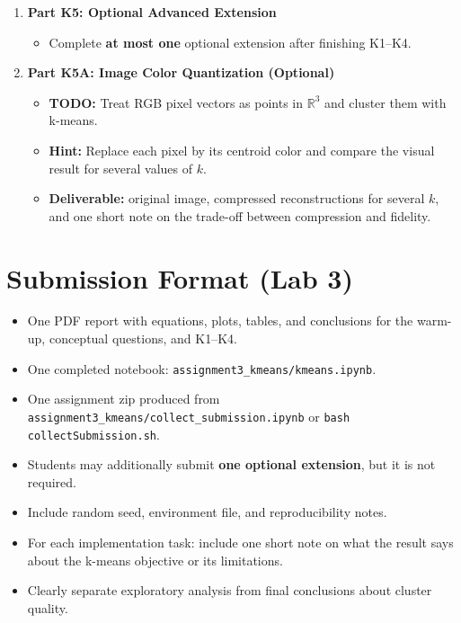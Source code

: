 \begin{enumerate}[label=\textbf{K\arabic*.}]
  \item \textbf{Part K5: Optional Advanced Extension}
  \begin{itemize}
    \item Complete \textbf{at most one} optional extension after finishing K1--K4.
  \end{itemize}

  \item \textbf{Part K5A: Image Color Quantization (Optional)}
  \begin{itemize}
    \item \textbf{TODO:} Treat RGB pixel vectors as points in $\mathbb{R}^3$ and cluster them with k-means.
    \item \textbf{Hint:} Replace each pixel by its centroid color and compare the visual result for several values of $k$.
    \item \textbf{Deliverable:} original image, compressed reconstructions for several $k$, and one short note on the trade-off between compression and fidelity.
  \end{itemize}
\end{enumerate}

\section*{Submission Format (Lab 3)}
\begin{itemize}
  \item One PDF report with equations, plots, tables, and conclusions for the warm-up, conceptual questions, and K1--K4.
  \item One completed notebook: \texttt{assignment3\_kmeans/kmeans.ipynb}.
  \item One assignment zip produced from \texttt{assignment3\_kmeans/collect\_submission.ipynb} or \texttt{bash collectSubmission.sh}.
  \item Students may additionally submit \textbf{one optional extension}, but it is not required.
  \item Include random seed, environment file, and reproducibility notes.
  \item For each implementation task: include one short note on what the result says about the k-means objective or its limitations.
  \item Clearly separate exploratory analysis from final conclusions about cluster quality.
\end{itemize}
